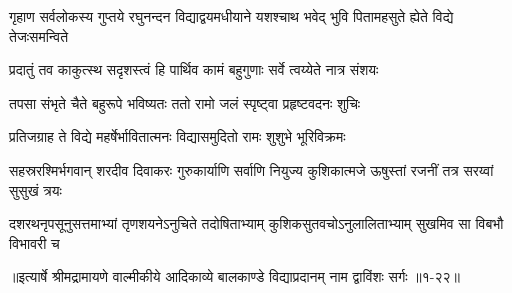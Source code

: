 \threelineshloka
{गृहाण सर्वलोकस्य गुप्तये रघुनन्दन}
{विद्याद्वयमधीयाने यशश्चाथ भवेद् भुवि}
{पितामहसुते ह्येते विद्ये तेजःसमन्विते} %

\twolineshloka
{प्रदातुं तव काकुत्स्थ सदृशस्त्वं हि पार्थिव}
{कामं बहुगुणाः सर्वे त्वय्येते नात्र संशयः} %

\twolineshloka
{तपसा संभृते चैते बहुरूपे भविष्यतः}
{ततो रामो जलं स्पृष्ट्वा प्रहृष्टवदनः शुचिः} %

\twolineshloka
{प्रतिजग्राह ते विद्ये महर्षेर्भावितात्मनः}
{विद्यासमुदितो रामः शुशुभे भूरिविक्रमः} %

\threelineshloka
{सहस्ररश्मिर्भगवान् शरदीव दिवाकरः}
{गुरुकार्याणि सर्वाणि नियुज्य कुशिकात्मजे}
{ऊषुस्तां रजनीं तत्र सरय्वां सुसुखं त्रयः} %

\twolineshloka
{दशरथनृपसूनुसत्तमाभ्यां तृणशयनेऽनुचिते तदोषिताभ्याम्}
{कुशिकसुतवचोऽनुलालिताभ्याम् सुखमिव सा विबभौ विभावरी च} %


॥इत्यार्षे श्रीमद्रामायणे वाल्मीकीये आदिकाव्ये बालकाण्डे विद्याप्रदानम् नाम द्वाविंशः सर्गः ॥१-२२॥
